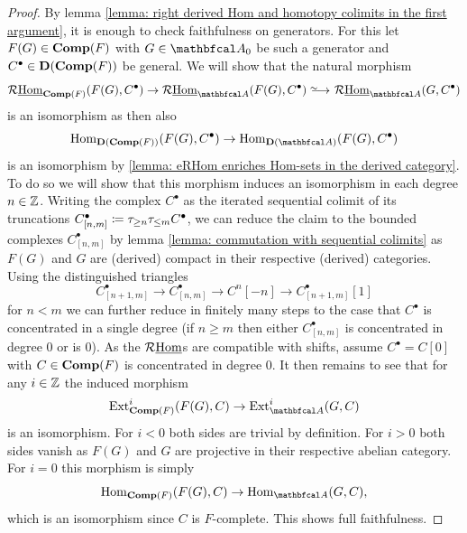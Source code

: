 \begin{proof}
	By lemma \ref{lemma: right derived Hom and homotopy colimits in the first argument}, it is enough to check faithfulness on generators. For this let $F(G)\in{{\mathbf{Comp}}(F)}$ with $G\in\category{A}_0$ be such a generator and $C^\bullet \in {{\mathbf{D}}({{\mathbf{Comp}}(F)})}$ be general. We will show that the natural morphism
		$$\eRHom_\completeMod{F}(F(G), C^\bullet) \to \eRHom_\category{A}(F(G), C^\bullet) \isorightarrow \eRHom_\category{A}(G, C^\bullet)$$
	is an isomorphism as then also
		$$\Hom_\derived{\completeMod{F}}(F(G), C^\bullet) \to \Hom_\derived{\category{A}}(F(G), C^\bullet)$$
	is an isomorphism by \ref{lemma: eRHom enriches Hom-sets in the derived category}. To do so we will show that this morphism induces an isomorphism in each degree $n\in {\mathbb{Z}}$. Writing the complex $C^\bullet$ as the iterated sequential colimit of its truncations $C^\bullet_{[n, m]}\coloneqq {\tau_{\ge n}}{\tau_{\le m}} C^\bullet$, we can reduce the claim to the bounded complexes $C^\bullet_{[n, m]}$ by lemma \ref{lemma: commutation with sequential colimits} as $F(G)$ and $G$ are (derived) compact in their respective (derived) categories. Using the distinguished triangles
		$$C^\bullet_{[n+1, m]}\to C^\bullet_{[n, m]}\to C^n[-n]\to C^\bullet_{[n+1, m]}[1]$$
	for $n<m$ we can further reduce in finitely many steps to the case that $C^\bullet$ is concentrated in a single degree (if $n\ge m$ then either $C^\bullet_{[n,m]}$ is concentrated in degree $0$ or is $0$). As the $\mathcal{R}{\underline{\operatorname{Hom}}}$s are compatible with shifts, assume $C^\bullet = C[0]$ with $C \in {{\mathbf{Comp}}(F)}$ is concentrated in degree $0$. It then remains to see that for any $i\in {\mathbb{Z}}$ the induced morphism
		$$\Ext_\completeMod{F}^i(F(G), C) \to \Ext_\category{A}^i(G, C)$$
	is an isomorphism. For $i<0$ both sides are trivial by definition. For $i>0$ both sides vanish as $F(G)$ and $G$ are projective in their respective abelian category. For $i=0$ this morphism is simply
		$$\Hom_\completeMod{F}(F(G), C) \to \Hom_\category{A}(G, C),$$
	which is an isomorphism since $C$ is $F$-complete. This shows full faithfulness.
	

\end{proof}
